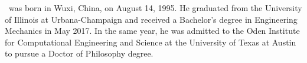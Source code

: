 



\begin{vita}

\theauthor\ was born in Wuxi, China, on August 14, 1995. He graduated
from the University of Illinois at Urbana-Champaign and received a
Bachelor's degree in Engineering Mechanics in May 2017. In the 
same year, he was admitted to the Oden Institute for Computational Engineering and Science 
at the University of Texas at Austin to pursue a Doctor of Philosophy degree.
\end{vita}
